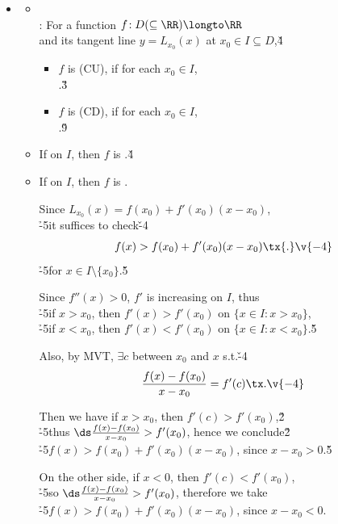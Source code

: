 \documentclass[dvipdfmx,a4paper,titlepage,9pt]{jsarticle}
\begin{document}
\begin{multicols*}{2}
\begin{itemize}[label={-}]
\newpage

\item{}
\begin{itemize}[label=\Cdot]
\setlength{\leftskip}{-10pt}
\item{}\\
: For a function $f\!:D(\subseteq\RR)\longto\RR$\\
\;\;and its tangent line $y=L_{x_0}(x)$ at $x_0\in I\subseteq D$,\v4
\begin{itemize}[label={-}]
\setlength{\leftskip}{-12pt}
\item $f$ is (CU), if for each $x_0\in I$, \\
.\v3
\item $f$ is (CD), if for each $x_0\in I$, \\
.\v9
\end{itemize}
\item If  on $I$, then $f$ is .\v4
\item If  on $I$, then $f$ is .

\begin{Pfbox}[(CU)]
Since $L_{x_0}(x)=f(x_0)+f'(x_0)(x-x_0)$, \\
\h{-5}it suffices to check\v{-4}
$$f(x)>f(x_0)+f'(x_0)(x-x_0)\tx{.}\v{-4}$$
\h{-5}for $x\in I\setminus\{x_0\}$.\v5

Since $f''(x)>0$, $f'$ is increasing on $I$, thus\\
\h{-5}if $x>x_0$, then $f'(x)>f'(x_0)$ on $\{x\in I:x>x_0\}$,\\
\h{-5}if $x<x_0$, then $f'(x)<f'(x_0)$ on $\{x\in I:x<x_0\}$.\v5

Also, by MVT, $\exists c$ between $x_0$ and $x$ s.t.\v{-4}
$$\frac{f(x)-f(x_0)}{x-x_0}=f'(c)\tx.\v{-4}$$

Then we have if $x>x_0$, then $f'(c)>f'(x_0)$,\v2 \\
\h{-5}thus $\ds\frac{f(x)-f(x_0)}{x-x_0}>f'(x_0)$, hence we conclude\v2\\
\h{-5}$f(x)>f(x_0)+f'(x_0)(x-x_0)$, since $x-x_0>0$.\v5

On the other side, if $x<0$, then $f'(c)<f'(x_0)$,\\
\h{-5}so $\ds\frac{f(x)-f(x_0)}{x-x_0}>f'(x_0)$, therefore we take\\
\h{-5}$f(x)>f(x_0)+f'(x_0)(x-x_0)$, since $x-x_0<0$.
\end{Pfbox}\;
\end{itemize}


\end{itemize}
\end{multicols*}
\end{document}
